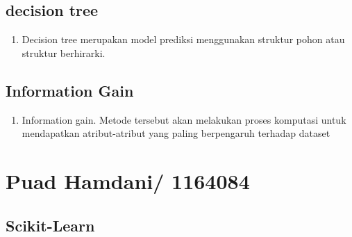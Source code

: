 \subsection{decision tree}
\begin{enumerate}
\item Decision tree merupakan model prediksi menggunakan struktur pohon atau struktur berhirarki.
\end{enumerate}

\subsection{Information Gain}
\begin{enumerate}
\item Information gain. Metode tersebut akan melakukan proses komputasi untuk mendapatkan atribut-atribut yang paling berpengaruh terhadap dataset
\end{enumerate}


\section{Puad Hamdani/ 1164084}
\subsection{Scikit-Learn}

